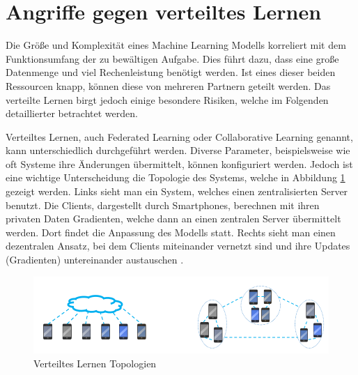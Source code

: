 \section{Angriffe gegen verteiltes Lernen}\label{sec:angriffe_verteiltes_lernen}

Die Größe und Komplexität eines Machine Learning Modells korreliert mit dem Funktionsumfang der zu bewältigen Aufgabe.
Dies führt dazu, dass eine große Datenmenge und viel Rechenleistung benötigt werden.
Ist eines dieser beiden Ressourcen knapp, können diese von mehreren Partnern geteilt werden.
Das verteilte Lernen birgt jedoch einige besondere Risiken, welche im Folgenden detaillierter betrachtet werden.

Verteiltes Lernen, auch Federated Learning oder Collaborative Learning genannt, kann unterschiedlich durchgeführt werden. 
Diverse Parameter, beispielsweise wie oft Systeme ihre Änderungen übermittelt, können konfiguriert werden.
Jedoch ist eine wichtige Unterscheidung die Topologie des Systems, welche in Abbildung \ref{fig:federated_learning_topo} gezeigt werden.
Links sieht man ein System, welches einen zentralisierten Server benutzt. 
Die Clients, dargestellt durch Smartphones, berechnen mit ihren privaten Daten Gradienten, welche dann an einen zentralen Server übermittelt werden. 
Dort findet die Anpassung des Modells statt.
Rechts sieht man einen dezentralen Ansatz, bei dem Clients miteinander vernetzt sind und ihre Updates (\zB Gradienten) untereinander austauschen \cite{P-89}. 

\begin{figure}[!htb]
    \centering
    \includegraphics[width=12cm]{figures/federated_learning}
    \caption{Verteiltes Lernen Topologien \cite{P-89}}
    \label{fig:federated_learning_topo}
\end{figure} 

